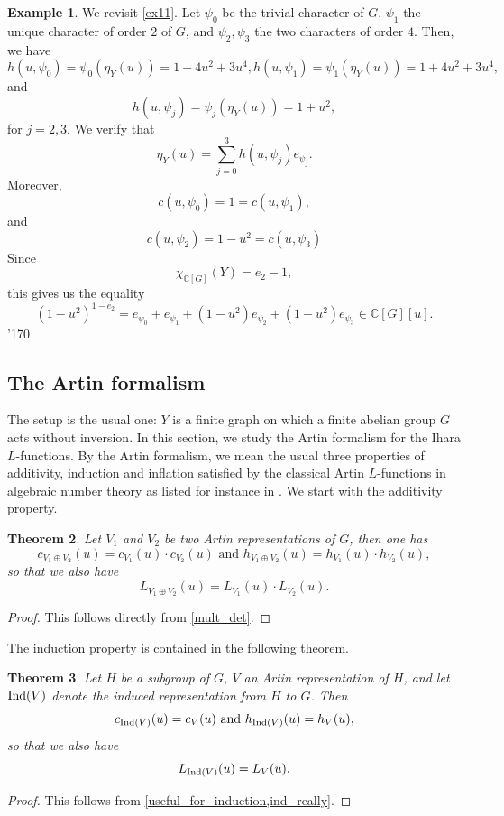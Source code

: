 \documentclass[11pt]{amsart}
\newtheorem{theorem}{Theorem}[section]
\numberwithin{equation}{section}
\theoremstyle{remark}
\theoremstyle{definition}
\newtheorem{example}[theorem]{Example}
\newcommand\xqed[1]{%
  \leavevmode\unskip\penalty9999 \hbox{}\nobreak\hfill
  \quad\hbox{#1}}
\newcommand\demo{\xqed{\manual\char'170}}
\begin{document}
\begin{example} \label{ex22}
We revisit \cref{ex11}.  Let $\psi_{0}$ be the trivial character of $G$, $\psi_{1}$ the unique character of order $2$ of $G$, and $\psi_{2}, \psi_{3}$ the two characters of order $4$.  Then, we have
$$h(u,\psi_{0}) = \psi_{0}(\eta_{Y}(u)) = 1-4u^{2} + 3u^{4}, h(u,\psi_{1}) = \psi_{1}(\eta_{Y}(u)) = 1 + 4u^{2} + 3u^{4},$$
and
$$h(u,\psi_{j}) = \psi_{j}(\eta_{Y}(u)) = 1+u^{2}, $$
for $j=2,3$.  We verify that
$$\eta_{Y}(u) = \sum_{j=0}^{3}h(u,\psi_{j})e_{\psi_{j}}. $$
Moreover,
$$c(u,\psi_{0}) = 1 = c(u,\psi_{1}), $$
and
$$c(u,\psi_{2}) = 1 - u^{2} = c(u,\psi_{3}) $$
Since 
$$\chi_{\mathbb{C}[G]}(Y) = e_{2} - 1, $$
this gives us the equality
$$(1-u^{2})^{1 - e_{2}} = e_{\psi_{0}} + e_{\psi_{1}} + (1-u^{2})e_{\psi_{2}} + (1-u^{2})e_{\psi_{3}} \in \mathbb{C}[G][u]. $$
\demo
\end{example}

\subsection{The Artin formalism} \label{af}
The setup is the usual one: $Y$ is a finite graph on which a finite abelian group $G$ acts without inversion.  In this section, we study the Artin formalism for the Ihara $L$-functions.  By the Artin formalism, we mean the usual three properties of additivity, induction and inflation satisfied by the classical Artin $L$-functions in algebraic number theory as listed for instance in \cite[page 15]{Tate:1984}.  We start with the additivity property.

\begin{theorem} \label{formalism_one}
Let $V_{1}$ and $V_{2}$ be two Artin representations of $G$, then one has
$$c_{V_{1} \oplus V_{2}}(u) = c_{V_{1}}(u) \cdot c_{V_{2}}(u) \text{ and } h_{V_{1} \oplus V_{2}}(u) = h_{V_{1}}(u) \cdot h_{V_{2}}(u), $$
so that we also have
$$L_{V_{1} \oplus V_{2}}(u) = L_{V_{1}}(u) \cdot L_{V_{2}}(u). $$
\end{theorem}
\begin{proof}
This follows directly from \cref{mult_det}.
\end{proof}


The induction property is contained in the following theorem.
\begin{theorem} \label{formalism_two}
Let $H$ be a subgroup of $G$, $V$ an Artin representation of $H$, and let ${\rm Ind}(V)$ denote the induced representation from $H$ to $G$.  Then
$$c_{{\rm Ind}(V)}(u) = c_{V}(u) \text{ and } h_{{\rm Ind}(V)}(u) = h_{V}(u), $$
so that we also have
$$L_{{\rm Ind}(V)}(u) = L_{V}(u). $$
\end{theorem}
\begin{proof}
This follows from \cref{useful_for_induction,ind_really}.
\end{proof}
\end{document}
